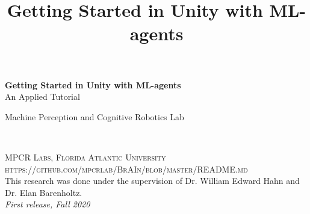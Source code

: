 \documentclass[11pt,fleqn,openany]{book} %
\begin{document}
\title{Getting Started in Unity with ML-agents}


\begingroup
\thispagestyle{empty}
\centering
\vspace*{5cm}
\par\normalfont\fontsize{35}{35}\sffamily\selectfont
\textbf{Getting Started in Unity with ML-agents}\\
{\LARGE An Applied Tutorial}\par %
\vspace*{1cm}
{\Huge Machine Perception and Cognitive Robotics Lab}\par %
\endgroup


\newpage
~\vfill
\thispagestyle{empty}


\noindent \textsc{MPCR Labs, Florida Atlantic University}\\

\noindent \textsc{https://github.com/mpcrlab/BrAIn/blob/master/README.md}\\ %

\noindent This research was done under the supervision of Dr. William Edward Hahn and Dr. Elan Barenholtz.\\ %

\noindent \textit{First release, Fall 2020} %



\pagestyle{empty} %

\tableofcontents %
\end{document}
